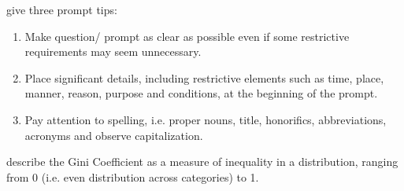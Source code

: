 \citet{fu_learning_2024} give three prompt tips:
\begin{enumerate}
    \item Make question/ prompt as clear as possible even if some restrictive requirements may seem unnecessary.
    \item Place significant details, including restrictive elements such as time, place, manner, reason, purpose and conditions, at the beginning of the prompt.
    \item Pay attention to spelling, i.e. proper nouns, title, honorifics, abbreviations, acronyms and observe capitalization.
\end{enumerate}


\citet{fu_learning_2024} describe the Gini Coefficient as a measure of inequality in a distribution, ranging from 0 (i.e. even distribution across categories) to 1.
